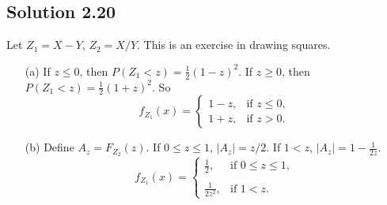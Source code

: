 \subsection*{Solution 2.20}

Let $Z_1 = X - Y$, $Z_2 = X/Y$.
This is an exercise in drawing squares.
\begin{itemize}
    \item[(a)] If $z \leq 0$, then $P(Z_1 < z) = \frac{1}{2}(1 - z)^2$. If $z \geq 0$, then $P(Z_1 < z) = \frac{1}{2}(1 + z)^2$. So
        \begin{equation*}
            f_{Z_1}(x) = \left\{ \begin{array}{cc}
                1 - z, & \text{if } z \leq 0, \\
                1 + z, & \text{if } z > 0.
            \end{array} \right.
        \end{equation*}
    \item[(b)] Define $A_z = F_{Z_2}(z)$.
        If $0 \leq z \leq 1$, $|A_z| = z/2$. If $1 < z$, $|A_z| = 1 - \frac{1}{2z}$.
        \begin{equation*}
            f_{Z_1}(x) = \left\{ \begin{array}{cc}
                \frac{1}{2}, & \text{if } 0 \leq z \leq 1, \\
                \\
                \frac{1}{2z^2}, & \text{if } 1 < z.
            \end{array} \right.
        \end{equation*}
\end{itemize}
